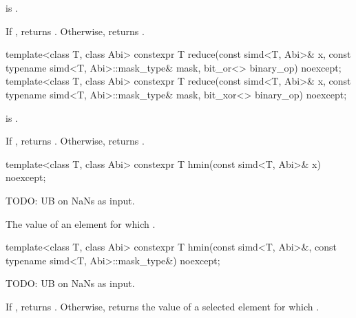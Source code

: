 \begin{itemdescr}
  \pnum\constraints
   is .

  \pnum\returns
  If , returns . Otherwise, returns  \forallmaskedi.
\end{itemdescr}

\begin{itemdecl}
template<class T, class Abi>
  constexpr T reduce(const simd<T, Abi>& x, const typename simd<T, Abi>::mask_type& mask,
                     bit_or<> binary_op) noexcept;
template<class T, class Abi>
  constexpr T reduce(const simd<T, Abi>& x, const typename simd<T, Abi>::mask_type& mask,
                     bit_xor<> binary_op) noexcept;
\end{itemdecl}

\begin{itemdescr}
  \pnum\constraints
   is .

  \pnum\returns
  If , returns . Otherwise, returns  \forallmaskedi.
\end{itemdescr}

\begin{itemdecl}
template<class T, class Abi> constexpr T hmin(const simd<T, Abi>& x) noexcept;
\end{itemdecl}

\begin{itemdescr}
  \pnum\expects
  TODO: UB on NaNs as input.

  \pnum\returns
  The value of an element  for which  \foralli.
\end{itemdescr}

\begin{itemdecl}
template<class T, class Abi>
  constexpr T hmin(const simd<T, Abi>&, const typename simd<T, Abi>::mask_type&) noexcept;
\end{itemdecl}

\begin{itemdescr}
  \pnum\expects
  TODO: UB on NaNs as input.

  \pnum\returns
  If , returns .
  Otherwise, returns the value of a selected element  for which  \forallmaskedi.
\end{itemdescr}

